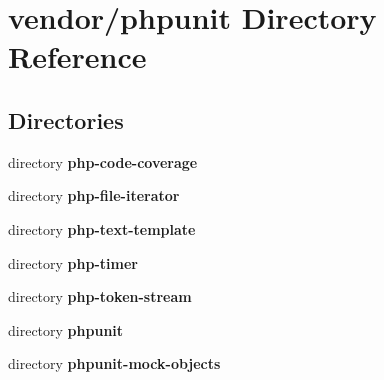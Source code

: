 \section{vendor/phpunit Directory Reference}
\label{dir_bd9f6adfe844cb87b9b59dac5edc780f}
\subsection*{Directories}
\begin{DoxyCompactItemize}
\item 
directory {\bf php-\/code-\/coverage}
\item 
directory {\bf php-\/file-\/iterator}
\item 
directory {\bf php-\/text-\/template}
\item 
directory {\bf php-\/timer}
\item 
directory {\bf php-\/token-\/stream}
\item 
directory {\bf phpunit}
\item 
directory {\bf phpunit-\/mock-\/objects}
\end{DoxyCompactItemize}
